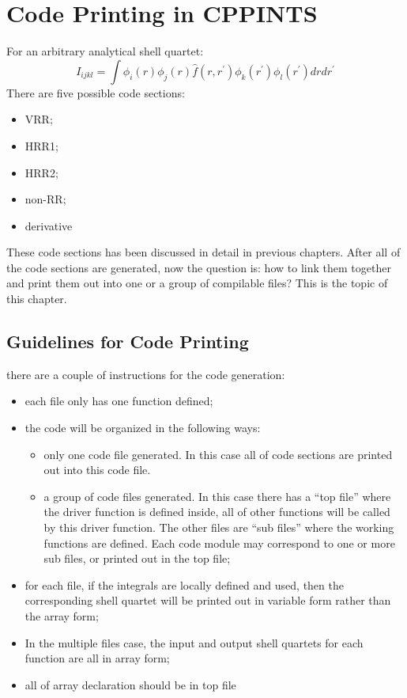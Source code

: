 


\chapter{Code Printing in CPPINTS}

For an arbitrary analytical shell quartet:
\begin{equation}
 I_{ijkl} = \int \phi_{i}(r)\phi_{j}(r)\hat{f}(r,r^{'})\phi_{k}(r^{'})\phi_{l}(r^{'}) dr dr^{'}
\end{equation}
There are five possible code sections:
\begin{itemize}
 \item VRR;
 \item HRR1;
 \item HRR2;
 \item non-RR;
 \item derivative
\end{itemize}
These code sections has been discussed in detail in previous chapters. After all of 
the code sections are generated, now the question is: how to link them together 
and print them out into one or a group of compilable files? This is the topic
of this chapter.

\section{Guidelines for Code Printing}
\label{code_generation_guide}

there are a couple of instructions for the code generation:
\begin{itemize}
 \item each file only has one function defined;
 \item the code will be organized in the following ways:
 \begin{itemize}
  \item only one code file generated. In this case all of code sections are 
  printed out into this code file.
  \item a group of code files generated. In this case there has a ``top file''
  where the driver function is defined inside, all of other functions will be 
  called by this driver function. The other files are ``sub files'' where
  the working functions are defined. Each code module may correspond to one 
  or more sub files, or printed out in the top file;
 \end{itemize}
 \item for each file, if the integrals are locally defined and used, then the 
 corresponding shell quartet will be printed out in variable form rather 
 than the array form;
 \item In the multiple files case, the input and output shell quartets for 
 each function are all in array form;
 \item all of array declaration should be in top file
\end{itemize}


